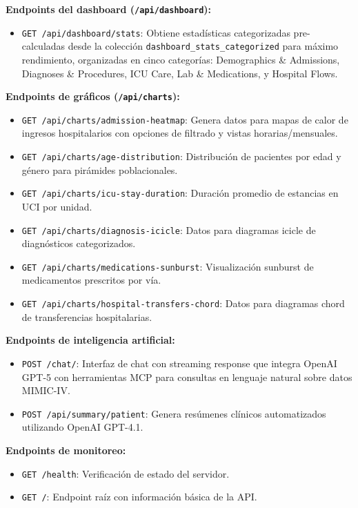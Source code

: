 \newpage
\textbf{Endpoints del dashboard (\texttt{/api/dashboard}):}
\begin{itemize}
\item \texttt{GET /api/dashboard/stats}: Obtiene estadísticas categorizadas pre-calculadas desde la colección \texttt{dashboard\_stats\_categorized} para máximo rendimiento, organizadas en cinco categorías: Demographics \& Admissions, Diagnoses \& Procedures, ICU Care, Lab \& Medications, y Hospital Flows.
\end{itemize}

\textbf{Endpoints de gráficos (\texttt{/api/charts}):}
\begin{itemize}
\item \texttt{GET /api/charts/admission-heatmap}: Genera datos para mapas de calor de ingresos hospitalarios con opciones de filtrado y vistas horarias/mensuales.
\item \texttt{GET /api/charts/age-distribution}: Distribución de pacientes por edad y género para pirámides poblacionales.
\item \texttt{GET /api/charts/icu-stay-duration}: Duración promedio de estancias en UCI por unidad.
\item \texttt{GET /api/charts/diagnosis-icicle}: Datos para diagramas icicle de diagnósticos categorizados.
\item \texttt{GET /api/charts/medications-sunburst}: Visualización sunburst de medicamentos prescritos por vía.
\item \texttt{GET /api/charts/hospital-transfers-chord}: Datos para diagramas chord de transferencias hospitalarias.
\end{itemize}

\textbf{Endpoints de inteligencia artificial:}
\begin{itemize}
\item \texttt{POST /chat/}: Interfaz de chat con streaming response que integra OpenAI GPT-5 con herramientas MCP para consultas en lenguaje natural sobre datos MIMIC-IV.
\item \texttt{POST /api/summary/patient}: Genera resúmenes clínicos automatizados utilizando OpenAI GPT-4.1.
\end{itemize}

\textbf{Endpoints de monitoreo:}
\begin{itemize}
\item \texttt{GET /health}: Verificación de estado del servidor.
\item \texttt{GET /}: Endpoint raíz con información básica de la API.
\end{itemize}

